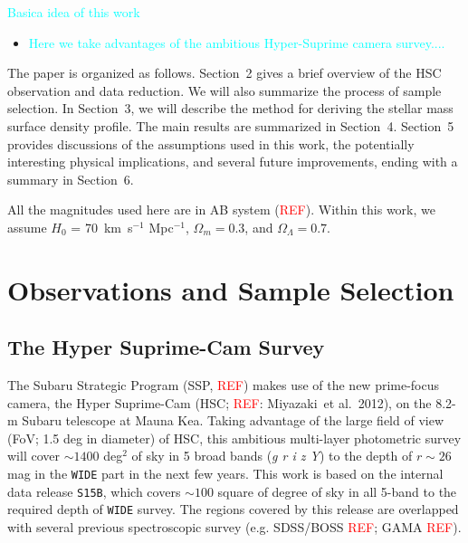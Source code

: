 \documentclass[preprint]{aastex}
\def\etal{{\ et al.~}}
\newcommand{\plan}[1]{\textcolor{cyan}{#1}}
\newcommand{\addref}{{\textcolor{red}{REF}}}
\begin{document}
\begin{CJK*}{UTF8}{gbsn}
    \plan{Basica idea of this work}
    \begin{itemize}
        \item \plan{Here we take advantages of the ambitious Hyper-Suprime camera 
            survey....}
    \end{itemize}

    The paper is organized as follows. Section~2 gives a brief overview of the HSC
    observation and data reduction.  We will also summarize the process of sample
    selection.  In Section~3, we will describe the method for deriving the stellar mass 
    surface density profile.  The main results are summarized in Section~4.  Section~5 
    provides discussions of the assumptions used in this work, the potentially interesting
    physical implications, and several future improvements, ending with a summary in
    Section~6.

    All the magnitudes used here are in AB system (\addref).  
    Within this work, we assume $H_0$ = 70~km~s$^{-1}$ Mpc$^{-1}$, ${\Omega}_m=0.3$, 
    and ${\Omega}_{\Lambda}=0.7$.
    

\section{Observations and Sample Selection}

\subsection{The Hyper Suprime-Cam Survey}

    The Subaru Strategic Program (SSP, \addref ) makes use of the new prime-focus 
    camera, the Hyper Suprime-Cam (HSC; \addref: Miyazaki\etal 2012), on the 8.2-m 
    Subaru telescope at Mauna Kea.  
    Taking advantage of the large field of view (FoV; 1.5 deg in diameter) of HSC, 
    this ambitious multi-layer photometric survey will cover $\sim 1400$ deg$^2$ of 
    sky in 5 broad bands (\textit{g r i z Y}) to the depth of $r \sim 26$ mag in the 
    \texttt{WIDE} part in the next few years.  
    This work is based on the internal data release \texttt{S15B}, which covers 
    $\sim 100$ square of degree of sky in all 5-band to the required depth of 
    \texttt{WIDE} survey.  
    The regions covered by this release are overlapped with several previous 
    spectroscopic survey (e.g. SDSS/BOSS \addref; GAMA \addref).


\end{CJK*}
\end{document}
